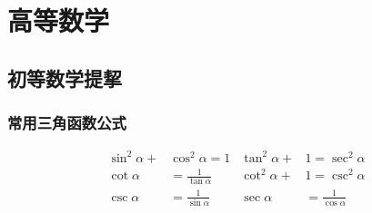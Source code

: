 \section{高等数学}
\subsection{初等数学提挈}
\subsubsection{常用三角函数公式}
\begin{align*}
    \sin^2 \alpha + & \cos^2\alpha = 1 &
    \tan^2 \alpha + & 1 = \sec^2 \alpha \\
    \cot \alpha  & =\frac{1}{\tan \alpha} &
    \cot^2 \alpha + & 1 = \csc^2 \alpha \\
    \csc \alpha & =\frac{1}{\sin \alpha} &
    \sec \alpha & = \frac{1}{\cos \alpha} 
\end{align*}
